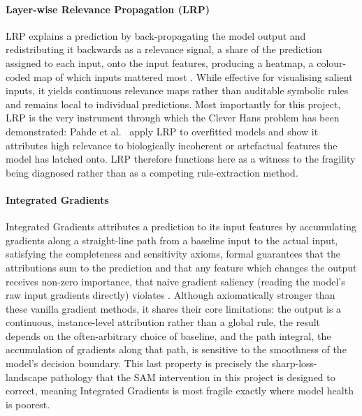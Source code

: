 \paragraph{Layer-wise Relevance Propagation (LRP)}
LRP explains a prediction by back-propagating the model output and redistributing it backwards as a
relevance signal, a share of the prediction assigned to each input, onto the input features, producing a
heatmap, a colour-coded map of which inputs mattered most \cite{Bach2015,Samek2017}. While effective for
visualising salient inputs, it yields continuous relevance maps rather than auditable symbolic rules and
remains local to individual predictions. Most importantly for this project, LRP is the very instrument
through which the Clever Hans problem has been demonstrated: Pahde et al.~\cite{Pahde2023} apply LRP to
overfitted models and show it attributes high relevance to biologically incoherent or artefactual
features the model has latched onto. LRP therefore functions here as a witness to the fragility being
diagnosed rather than as a competing rule-extraction method.

\paragraph{Integrated Gradients}
Integrated Gradients attributes a prediction to its input features by accumulating gradients along a
straight-line path from a baseline input to the actual input, satisfying the completeness and
sensitivity axioms, formal guarantees that the attributions sum to the prediction and that any feature
which changes the output receives non-zero importance, that naive gradient saliency (reading the model's
raw input gradients directly) violates \cite{Sundararajan2017}. Although axiomatically stronger than
these vanilla gradient methods, it shares their core limitations: the output is a continuous,
instance-level attribution rather than a global rule, the result depends on the often-arbitrary choice
of baseline, and the path integral, the accumulation of gradients along that path, is sensitive to the
smoothness of the model's decision boundary. This last property is precisely the sharp-loss-landscape
pathology that the SAM intervention in this project is designed to correct, meaning Integrated Gradients
is most fragile exactly where model health is poorest.

